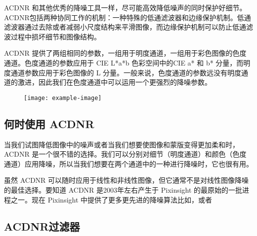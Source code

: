 ACDNR 和其他优秀的降噪工具一样，尽可能高效降低噪声的同时保护好细节。ACDNR包括两种协同工作的机制：一种特殊的低通滤波器和边缘保护机制。低通滤波器通过去除或者减弱小尺度结构来平滑图像，而边缘保护机制可以防止低通滤波过程中损坏细节和图像结构。

ACDNR 提供了两组相同的参数，一组用于明度通道，一组用于彩色图像的色度通道。色度通道的参数应用于 CIE L*a*b 色彩空间中的CIE a* 和 b* 分量，而明度通道参数应用于彩色图像的 L 分量。一般来说，色度通道的参数远没有明度通道的激进，因此我们在色度通道中可以运用一个更强烈的降噪参数。

\begin{figure}[h]
  \centering
  \texttt{[image: example-image]}
\end{figure}


\subsection{何时使用 ACDNR}

当我们试图降低图像中的噪声或者当我们想要使图像和蒙版变得更加柔和时，ACDNR 是一个很不错的选择。我们可以分别对细节（明度通道）和颜色（色度通道）应用降噪，所以当我们想要在两个通道中的一种进行降噪时，它也很有用。

虽然 ACDNR 可以随时应用于线性和非线性图像，但它通常不是对线性图像降噪的最佳选择。要知道 ACDNR 是2003年左右产生于 Pixinsight 的最原始的一批进程之一。现在 Pixinsight 中提供了更多更先进的降噪算法比如，或者 


\subsection{ACDNR过滤器}

